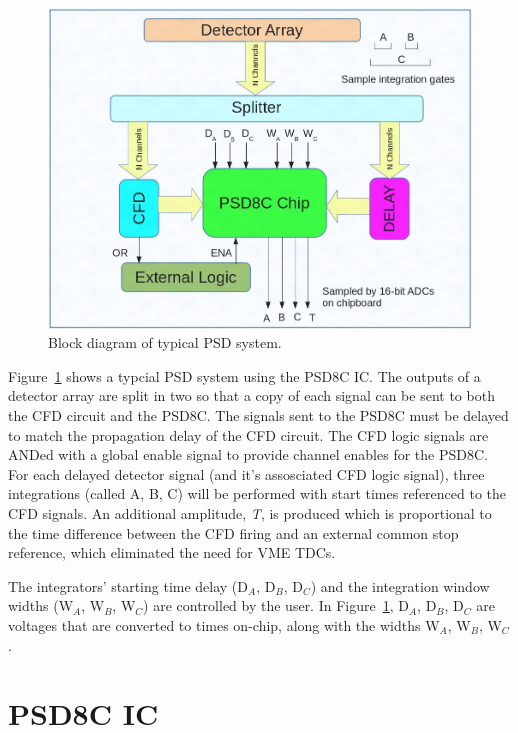 \documentclass[12pt,oneside,final]{siuethesis}
\theoremstyle{definition}
\begin{document}
\begin{figure}[htbp!]
	\centering
 	\includegraphics[scale=0.6,keepaspectratio=true]{./ch1_figures/PSD_block.png}
 	\caption{Block diagram of typical PSD system.}
 	\label{FIG:PSD_BLOCK}
\end{figure}

\par Figure~\ref{FIG:PSD_BLOCK} shows a typcial PSD system using the PSD8C IC. The outputs of a detector array are split in two so that a copy of each signal can be sent to both the CFD circuit and the PSD8C. The signals sent to the PSD8C must be delayed to match the propagation delay of the CFD circuit. The CFD logic signals are ANDed with a global enable signal to provide channel enables for the PSD8C. For each delayed detector signal (and it's assosciated CFD logic signal), three integrations (called A, B, C) will be performed with start times referenced to the CFD signals. An additional amplitude, \emph{T}, is produced which is proportional to the time difference between the CFD firing and an external common stop reference, which eliminated the need for VME TDCs.
\par The integrators' starting time delay (D$_{A}$, D$_{B}$, D$_{C}$) and the integration window widths (W$_{A}$, W$_{B}$, W$_{C}$) are controlled by the user. In Figure~\ref{FIG:PSD_BLOCK}, D$_{A}$, D$_{B}$, D$_{C}$ are voltages that are converted to times on-chip, along with the widths W$_{A}$, W$_{B}$, W$_{C}$.

\section{PSD8C IC}
\end{document}
